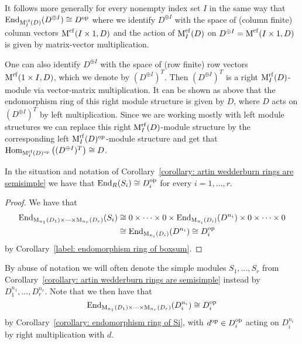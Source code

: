 \begin{remark}
  \label{remark: infinite matrix vector space correspondence for skew fields}
  It follows more generally for every nonempty index set $I$ in the same way that $\operatorname{End}_{\operatorname{M}_I^{{\operatorname{cf}}}(D)}( D^{\oplus I} ) \cong D^{\operatorname{op}}$ where we identify $D^{\oplus I}$ with the space of (column finite) column vectors $\operatorname{M}^{{\operatorname{cf}}}(I \times 1, D)$ and the action of $\operatorname{M}_I^{{\operatorname{cf}}}(D)$ on $D^{\oplus I} = \operatorname{M}^{{\operatorname{cf}}}(I \times 1, D)$ is given by matrix-vector multiplication.
  
  One can also identify $D^{\oplus I}$ with the space of (row finite) row vectors $\operatorname{M}^{{\operatorname{rf}}}(1 \times I, D)$, which we denote by $(D^{\oplus I})^T$.
  Then $(D^{\oplus I})^T$ is a right $\operatorname{M}_I^{{\operatorname{rf}}}(D)$-module via vector-matrix multiplication.
  It can be shown as above that the endomorphism ring of this right module structure is given by $D$, where $D$ acts on $(D^{\oplus I})^T$ by left multiplication.
  Since we are working mostly with left module structures we can replace this right $\operatorname{M}_I^{{\operatorname{rf}}}(D)$-module structure by the corresponding left $\operatorname{M}_I^{{\operatorname{rf}}}(D)^{\operatorname{op}}$-module structure and get that $\operatorname{Hom}_{\operatorname{M}_I^{{\operatorname{rf}}}(D)^{\operatorname{op}}}\left( (D^{\oplus I})^T \right) \cong D$.
\end{remark}


\begin{corollary}
  \label{corollary: endomorphism ring of Si}
  In the situation and notation of Corollary~\ref{corollary: artin wedderburn rings are semisimple} we have that $\operatorname{End}_R(S_i) \cong D_i^{\operatorname{op}}$ for every $i = 1, \dotsc, r$.
\end{corollary}


\begin{proof}
  We have that
  \begin{align*}
            \operatorname{End}_{\operatorname{M}_{n_1}(D_1) \times \dotsb \times \operatorname{M}_{n_r}(D_r)}(S_i)
    &\cong  0 \times \dotsb \times 0 \times \operatorname{End}_{\operatorname{M}_{n_i}(D_i)}(D^{n_i}) \times 0 \times \dotsb \times 0 \\
    &\cong  \operatorname{End}_{\operatorname{M}_{n_i}(D_i)}(D^{n_i})
     \cong  D_i^{\operatorname{op}}
  \end{align*}
  by Corollary~\ref{label: endomorphism ring of boxsum}.
\end{proof}



\begin{notation}
  \label{notation: simple modules over products of matrix rings}
  By abuse of notation we will often denote the simple modules $S_1, \dotsc, S_r$ from Corollary~\ref{corollary: artin wedderburn rings are semisimple} instead by $D_1^{n_1}, \dotsc, D_r^{n_r}$.
  Note that we then have that
  \[
          \operatorname{End}_{\operatorname{M}_{n_1}(D_1) \times \dotsb \times \operatorname{M}_{n_r}(D_r)}(D_i^{n_i})
    \cong D_i^{\operatorname{op}}
  \]
  by Corollary~\ref{corollary: endomorphism ring of Si}, with $d^{\operatorname{op}} \in D_i^{\operatorname{op}}$ acting on $D_i^{n_i}$ by right multiplication with $d$.
\end{notation}







